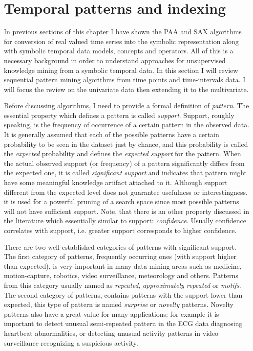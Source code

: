 \section{Temporal patterns and indexing} \label{tpatterns}
In previous sections of this chapter I have shown the PAA and SAX algorithms for conversion of real valued time series into the symbolic representation along with symbolic temporal data models, concepts and operators. All of this is a necessary background in order to understand approaches for unsupervised knowledge mining from a symbolic temporal data. In this section I will review sequential pattern mining algorithms from time points and time-intervals data. I will focus the review on the univariate data then extending it to the multivariate.

Before discussing algorithms, I need to provide a formal definition of \textit{pattern}. The essential property which defines a pattern is called \textit{support}. Support, roughly speaking, is the frequency of occurrence of a certain pattern in the observed data. It is generally assumed that each of the possible patterns have a certain probability to be seen in the dataset just by chance, and this probability is called the \textit{expected} probability and defines the \textit{expected support} for the pattern. When the actual observed support (or frequency) of a pattern significantly differs from the expected one, it is called \textit{significant support} and indicates that pattern might have some meaningful knowledge artifact attached to it. Although support different from the expected level does not guarantee usefulness or interestingness, it is used for a powerful pruning of a search space since most possible patterns will not have sufficient support. Note, that there is an other property \cite{citeulike:2804633} discussed in the literature which essentially similar to support: \textit{confidence}. Usually confidence correlates with support, i.e. greater support corresponds to higher confidence.

There are two well-established categories of patterns with significant support. The first category of patterns, frequently occurring ones (with support higher than expected), is very important in many data mining areas such as medicine, motion-capture, robotics, video surveillance, meteorology and others. Patterns from this category usually named as \textit{repeated}, \textit{approximately repeated} or \textit{motifs}. The second category of patterns, contains patterns with the support lower than expected, this type of pattern is named \textit{surprise} or \textit{novelty} patterns. Novelty patterns also have a great value for many applications: for example it is important to detect unusual semi-repeated pattern in the ECG data diagnosing heartbeat abnormalities, or detecting unusual activity patterns in video surveillance recognizing a suspicious activity.

